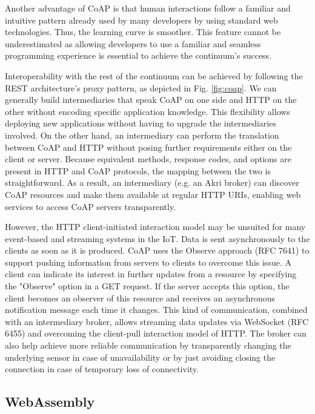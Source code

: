 Another advantage of CoAP is that human interactions follow a familiar and intuitive pattern already used by many developers by using standard web technologies. Thus, the learning curve is smoother. This feature cannot be underestimated as allowing developers to use a familiar and seamless programming experience is essential to achieve the continuum's success.

Interoperability with the rest of the continuum can be achieved by following the REST architecture's proxy pattern, as depicted in Fig. \ref{fig:coap}. We can generally build intermediaries that speak CoAP on one side and HTTP on the other without encoding specific application knowledge. This flexibility allows deploying new applications without having to upgrade the intermediaries involved. On the other hand, an intermediary can perform the translation between CoAP and HTTP without posing further requirements either on the client or server. Because equivalent methods, response codes, and options are present in HTTP and CoAP protocols, the mapping between the two is straightforward. As a result, an intermediary (e.g. an Akri broker) can discover CoAP resources and make them available at regular HTTP URIs, enabling web services to access CoAP servers transparently.

However, the HTTP client-initiated interaction model may be unsuited for many event-based and streaming systems in the IoT. Data is sent asynchronously to the clients as soon as it is produced. CoAP uses the Observe approach (RFC 7641) to support pushing information from servers to clients to overcome this issue. A client can indicate its interest in further updates from a resource by specifying the "Observe" option in a GET request. If the server accepts this option, the client becomes an observer of this resource and receives an asynchronous notification message each time it changes. This kind of communication, combined with an intermediary broker, allows streaming data updates via WebSocket (RFC 6455) and overcoming the client-pull interaction model of HTTP. The broker can also help achieve more reliable communication by transparently changing the underlying sensor in case of unavailability or by just avoiding closing the connection in case of temporary loss of connectivity.

\subsection{WebAssembly}
\label{sec:webassembly}

